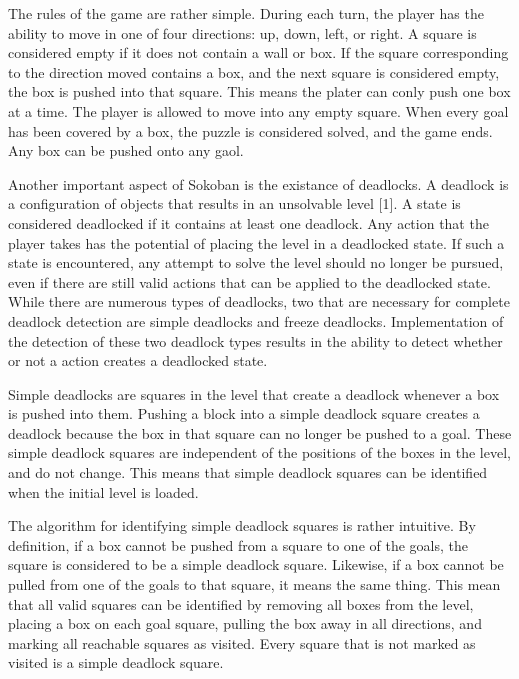 \documentclass[times, 10pt,twocolumn]{article}
\begin{document}
The rules of the game are rather simple. During each turn, the player has the ability to move in one of four directions: up, down, left, or right. A square is considered empty if it does not contain a wall or box. If the square corresponding to the direction moved contains a box, and the next square is considered empty, the box is pushed into that square. This means the plater can conly push one box at a time. The player is allowed to move into any empty square. When every goal has been covered by a box, the puzzle is considered solved, and the game ends. Any box can be pushed onto any gaol. 


Another important aspect of Sokoban is the existance of deadlocks. A deadlock is a configuration of objects that results in an unsolvable level [1]. A state is considered deadlocked if it contains at least one deadlock. Any action that the player takes has the potential of placing the level in a deadlocked state. If such a state is encountered, any attempt to solve the level should no longer be pursued, even if there are still valid actions that can be applied to the deadlocked state. While there are numerous types of deadlocks, two that are necessary for complete deadlock detection are simple deadlocks and freeze deadlocks. Implementation of the detection of these two deadlock types results in the ability to detect whether or not a action creates a deadlocked state. 


Simple deadlocks are squares in the level that create a deadlock whenever a box is pushed into them. Pushing a block into a simple deadlock square creates a deadlock because the box in that square can no longer be pushed to a goal. These simple deadlock squares are independent of the positions of the boxes in the level, and do not change. This means that simple deadlock squares can be identified when the initial level is loaded. 

The algorithm for identifying simple deadlock squares is rather intuitive. By definition, if a box cannot be pushed from a square to one of the goals, the square is considered to be a simple deadlock square. Likewise, if a box cannot be pulled from one of the goals to that square, it means the same thing. This mean that all valid squares can be identified by removing all boxes from the level, placing a box on each goal square, pulling the box away in all directions, and marking all reachable squares as visited. Every square that is not marked as visited is a simple deadlock square. \cite{Wiki}
\end{document}
